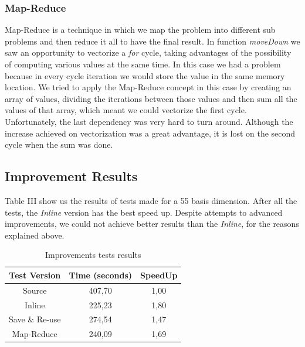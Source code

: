\documentclass[conference]{IEEEtran}
\begin{document}
\subsubsection{Map-Reduce}
Map-Reduce is a technique in which we map the problem into different sub problems and then reduce it all to have the final result.
In function \emph{moveDown} we saw an opportunity to vectorize a \emph{for} cycle, taking advantages of the possibility of computing various values at the same time.
In this case we had a problem because in every cycle iteration we would store the value in the same memory location.
We tried to apply the Map-Reduce concept in this case by creating an array of values, dividing the iterations between those values and then sum all the values of that array, which meant we could vectorize the first cycle.
Unfortunately, the last dependency was very hard to turn around. Although the increase achieved on vectorization was a great advantage, it is lost on the second cycle when the sum was done.
    
\subsection{Improvement Results}
    Table III show us the results of tests made for a 55 basis dimension. After all the tests, the \emph{Inline} version has the best speed up. Despite attempts to advanced improvements, we could not achieve better results than the \emph{Inline}, for the reasons explained above.
    
\begin{table}[ht!]
\centering
\label{my-label}

\begin{tabular}{|c|c|c|}
\hline
\rowcolor[HTML]{C0C0C0} 
{\color[HTML]{000000} Test Version} & {\color[HTML]{000000} Time (seconds)} & {\color[HTML]{000000} SpeedUp} \\ \hline
Source                          & 407,70            & 1,00          \\ \hline
Inline                          & 225,23            & 1,80          \\ \hline
Save \& Re-use                  & 274,54            & 1,47          \\ \hline
Map-Reduce                      & 240,09            & 1,69          \\ \hline
\end{tabular}
\caption{Improvements tests results}
\end{table}
    
\end{document}
